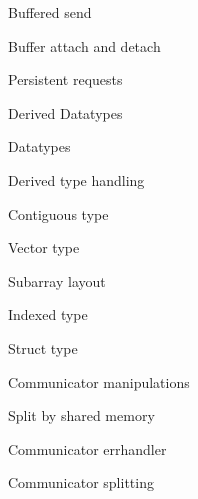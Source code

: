 \documentclass[11pt,headernav]{beamer}
\begin{document}
\begin{frame}[containsverbatim]{Buffered send}
  
\end{frame}
\begin{frame}[containsverbatim]{Buffer attach and detach}
  
\end{frame}
\begin{frame}[containsverbatim]{Persistent requests}
  
\end{frame}

 {Derived Datatypes}

\begin{frame}[containsverbatim]{Datatypes}
  
\end{frame}
\begin{frame}[containsverbatim]{Derived type handling}
  
\end{frame}
\begin{frame}[containsverbatim]{Contiguous type}
  
\end{frame}
\begin{frame}[containsverbatim]{Vector type}
  
\end{frame}
\begin{frame}[containsverbatim]{Subarray layout}
  
\end{frame}
\begin{frame}[containsverbatim]{Indexed type}
  
\end{frame}
\begin{frame}[containsverbatim]{Struct type}
  
\end{frame}

 {Communicator manipulations}

\begin{frame}[containsverbatim]{Split by shared memory}
  
\end{frame}

\begin{frame}[containsverbatim]{Communicator errhandler}
  
\end{frame}
\begin{frame}[containsverbatim]{Communicator splitting}
  
\end{frame}
\end{document}
